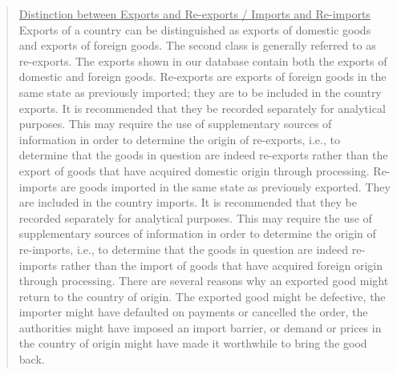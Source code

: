 \documentclass[nojss]{jss}\usepackage[]{graphicx}\usepackage[]{color}
\begin{document}
\begin{quote}
\underline{Distinction between Exports and Re-exports / Imports and Re-imports}\\
Exports of a country can be distinguished as exports of domestic goods and exports of foreign goods. The second class is generally referred to as re-exports. The exports shown in our database contain both the exports of domestic and foreign goods. Re-exports are exports of foreign goods in the same state as previously imported; they are to be included in the country exports. It is recommended that they be recorded separately for analytical purposes. This may require the use of supplementary sources of information in order to determine the origin of re-exports, i.e., to determine that the goods in question are indeed re-exports rather than the export of goods that have acquired domestic origin through processing. Re-imports are goods imported in the same state as previously exported. They are included in the country imports. It is recommended that they be recorded separately for analytical purposes. This may require the use of supplementary sources of information in order to determine the origin of re-imports, i.e., to determine that the goods in question are indeed re-imports rather than the import of goods that have acquired foreign origin through processing. There are several reasons why an exported good might return to the country of origin. The exported good might be defective, the importer might have defaulted on payments or cancelled the order, the authorities might have imposed an import barrier, or demand or prices in the country of origin might have made it worthwhile to bring the good back.
\end{quote}
\end{document}

